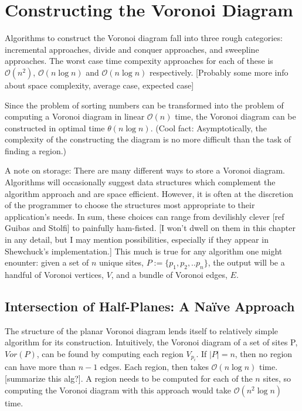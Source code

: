 \documentclass[12pt,twoside]{reedthesis}
\begin{document}
  \chapter*{Constructing the Voronoi Diagram}
    \setcounter{chapter}{1}
    \setcounter{section}{0}
  Algorithms to construct the Voronoi diagram fall into three rough categories: incremental approaches, divide and conquer approaches, and sweepline approaches. The worst case time compexity approaches for each of these is $\mathcal{O}(n^{2})$, $\mathcal{O}(n\log n)$ and $\mathcal{O}(n\log n)$ respectively. [Probably some more info about space complexity, average case, expected case]\par
  Since the problem of sorting numbers can be transformed into the problem of computing a Voronoi diagram in linear $\mathcal{O}(n)$ time, the Voronoi diagram can be constructed in optimal time $\theta(n\log n)$. (Cool fact: Asymptotically, the complexity of the constructing the diagram is no more difficult than the task of finding a region.)\par
  A note on storage: There are many different ways to store a Voronoi diagram. Algorithms will occasionally suggest data structures which complement the algorithm approach and are space efficient. However, it is often at the discretion of the programmer to choose the structures most appropriate to their application's needs. In sum, these choices can range from devilishly clever [ref Guibas and Stolfi] to painfully ham-fisted. [I won't dwell on them in this chapter in any detail, but I may mention possibilities, especially if they appear in Shewchuck's implementation.] This much is true for any algorithm one might enounter: given a set of $n$ unique sites, $P:=\{p_{1}, p_{2}, .. p_{n}\}$, the output will be a handful of Voronoi vertices, $V$, and a bundle of Voronoi edges, $E$. 

  \section{Intersection of Half-Planes: A Na{\"i}ve Approach} %
  \label{sec:a_naive_approach}
  The structure of the planar Voronoi diagram lends itself to relatively simple algorithm for its construction. Intuitively, the Voronoi diagram of a set of sites P, $Vor(P)$, can be found by computing each region $V_{p_{i}}$. If $|P| = n$, then no region can have more than $n-1$ edges. Each region, then takes $\mathcal{O}(n\log n)$ time. [summarize this alg?]. A region needs to be computed for each of the $n$ sites, so computing the Voronoi diagram with this approach would take $\mathcal{O}(n^{2}\log n)$ time.
\end{document}
